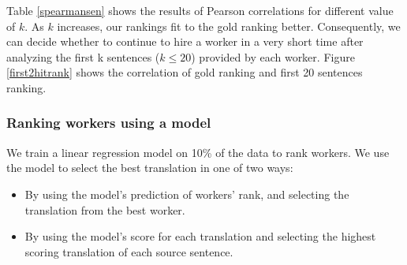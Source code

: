 Table \ref{spearmansen} shows the results of Pearson correlations for different value of $k$. As $k$ increases, our rankings fit to the gold ranking better. Consequently, we can decide whether to continue to hire a worker in a very short time after analyzing the first k sentences ($k\le20$) provided by each worker. Figure \ref{first2hitrank} shows the correlation of gold ranking and first 20 sentences ranking. 




\subsubsection{Ranking workers using a model}
We train a linear regression model on 10\% of the data to rank workers.  We use the model to select the best translation in one of two ways:
\begin{itemize}
\item By using the model's prediction of workers' rank, and selecting the translation from the best worker.  
\item By using the model's score for each translation and selecting the highest scoring translation of each source sentence. 
\end{itemize}


